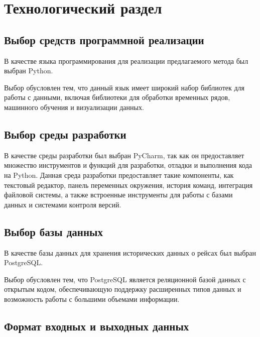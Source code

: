 \chapter{Технологический раздел}


\section{Выбор средств программной реализации}

В качестве языка программирования для реализации предлагаемого метода был выбран Python.

Выбор обусловлен тем, что данный язык имеет широкий набор библиотек для работы с данными, включая библиотеки для обработки временных рядов, машинного обучения и визуализации данных.

\section{Выбор среды разработки}

В качестве среды разработки был выбран PyCharm, так как он предоставляет множество инструментов и функций для разработки, отладки и выполнения кода на Python.
Данная среда разработки предоставляет такие компоненты, как текстовый редактор, панель переменных окружения, история команд, интеграция файловой системы, а также встроенные инструменты для работы с базами данных и системами контроля версий.

\section{Выбор базы данных}

В качестве базы данных для хранения исторических данных о рейсах был выбран PostgreSQL.

Выбор обусловлен тем, что PostgreSQL является реляционной базой данных с открытым кодом, обеспечивающую поддержку расширенных типов данных и возможность работы с большими объемами информации.

\section{Формат входных и выходных данных}

